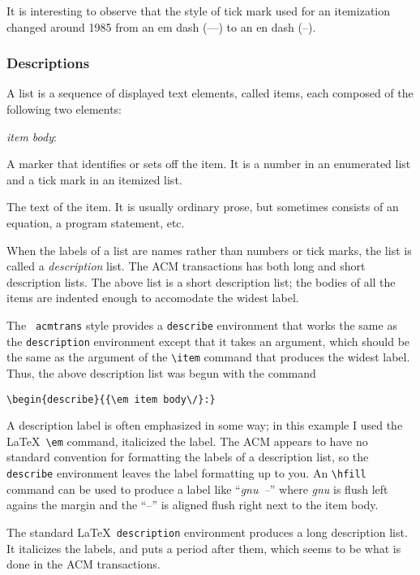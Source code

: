 It is interesting to observe that the style of tick mark used
for an itemization changed around 1985 from an em dash
(---) to an en dash (--).

\subsubsection{Descriptions}

A list is a sequence of displayed text elements, called items, each
composed of the following two elements:
\begin{describe}{{\em item body\/}:}
\item[{\em label\/}:]
A marker that identifies or sets off the item.  It
is a number in an enumerated list and a tick mark in an itemized list.

\item[{\em item body\/}:] The text of the item.  It is usually ordinary prose,
but sometimes consists of an equation, a program statement, etc.
\end{describe}

When the labels of a list are names rather than numbers or tick marks,
the list is called a {\em description\/} list.  The ACM transactions
has both long and short description lists.  The above list is a short
description list; the bodies of all the items are indented enough to
accomodate the widest label.

The {\tt
acmtrans} style provides a {\tt describe} environment that works the
same as the {\tt description} environment except that it takes an
argument, which should be the same as the argument of the \verb|\item|
command that produces the widest label.  Thus, the above description
list was begun with the command
\begin{verbatim}
\begin{describe}{{\em item body\/}:}
\end{verbatim}

A description label is often emphasized in some way; in this example I
used the \LaTeX\ \verb|\em| command, italicized the label.  The ACM
appears to have no standard convention for formatting the labels of a
description list, so the {\tt describe} environment leaves the label
formatting up to you.  An \verb|\hfill| command can be used to produce
a label like ``\mbox{\em gnu\ --\/}'' where {\em gnu\/} is flush left
agains the margin and the ``--'' is aligned flush right next to the
item body.

The standard \LaTeX\ {\tt description} environment produces a long
description list.  It italicizes the labels, and puts a period after
them, which seems to be what is done in the ACM transactions.


